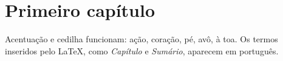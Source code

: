 \documentclass[a4paper]{report}
\begin{document}
\tableofcontents

\chapter{Primeiro capítulo}
Acentuação e cedilha funcionam: ação, coração, pé, avô, à toa. Os termos inseridos pelo
\LaTeX, como \emph{Capítulo} e \emph{Sumário}, aparecem em português.
\end{document}
